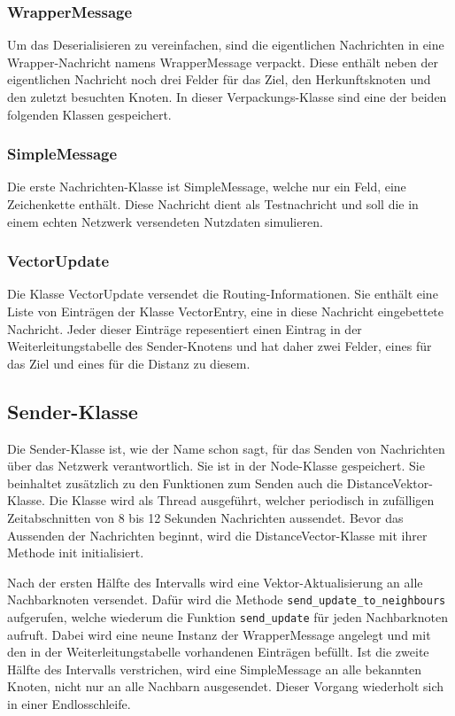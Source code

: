 \subsubsection{WrapperMessage}
Um das Deserialisieren zu vereinfachen, sind die eigentlichen Nachrichten in eine Wrapper-Nachricht namens WrapperMessage verpackt. Diese enthält neben der eigentlichen Nachricht noch drei Felder für das Ziel, den Herkunftsknoten und den zuletzt besuchten Knoten. In dieser Verpackungs-Klasse sind eine der beiden folgenden Klassen gespeichert. 
\subsubsection{SimpleMessage}
Die erste Nachrichten-Klasse ist SimpleMessage, welche nur ein Feld, eine Zeichenkette enthält. Diese Nachricht dient als Testnachricht und soll die in einem echten Netzwerk versendeten Nutzdaten simulieren. 
\subsubsection{VectorUpdate}
Die Klasse VectorUpdate versendet die Routing-Informationen. Sie enthält eine Liste von Einträgen der Klasse VectorEntry, eine in diese Nachricht eingebettete Nachricht. Jeder dieser Einträge repesentiert einen Eintrag in der Weiterleitungstabelle des Sender-Knotens und hat daher zwei Felder, eines für das Ziel und eines für die Distanz zu diesem.

\subsection{Sender-Klasse}
Die Sender-Klasse ist, wie der Name schon sagt, für das Senden von Nachrichten über das Netzwerk verantwortlich. Sie ist in der Node-Klasse gespeichert. Sie beinhaltet zusätzlich zu den Funktionen zum Senden auch die DistanceVektor-Klasse. Die Klasse wird als Thread ausgeführt, welcher periodisch in zufälligen Zeitabschnitten von 8 bis 12 Sekunden Nachrichten aussendet. Bevor das Aussenden der Nachrichten beginnt, wird die DistanceVector-Klasse mit ihrer Methode init initialisiert.

Nach der ersten Hälfte des Intervalls wird eine Vektor-Aktualisierung an alle Nachbarknoten versendet. Dafür wird die Methode \verb|send_update_to_neighbours| aufgerufen, welche wiederum die Funktion \verb|send_update| für jeden Nachbarknoten aufruft. Dabei wird eine neune Instanz der WrapperMessage angelegt und mit den in der Weiterleitungstabelle vorhandenen Einträgen befüllt. Ist die zweite Hälfte des Intervalls verstrichen, wird eine SimpleMessage an alle bekannten Knoten, nicht nur an alle Nachbarn ausgesendet. Dieser Vorgang wiederholt sich in einer Endlosschleife.

